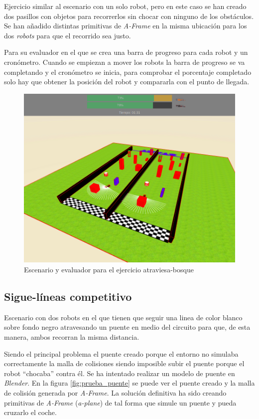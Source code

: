 Ejercicio similar al escenario con un solo robot, pero en este caso se han creado dos pasillos con objetos para recorrerlos sin chocar con ninguno de los obstáculos. Se han añadido distintas primitivas de \textit{A-Frame} en la misma ubicación para los dos \textit{robots} para que el recorrido sea justo.

Para su evaluador en el que se crea una barra de progreso para cada robot y un cronómetro. Cuando se empiezan a mover los robots la barra de progreso se va completando y el cronómetro se inicia, para comprobar el porcentaje completado solo hay que obtener la posición del robot y compararla con el punto de llegada.

\begin{figure}[H]
\centering           
\includegraphics[scale=0.3]{img/evaluador_forest.png}
\caption{Escenario y evaluador para el ejercicio atraviesa-bosque}
\label{fig:evaluador_bosque}
\end{figure}


\subsection{Sigue-líneas competitivo}

Escenario con dos robots en el que tienen que seguir una linea de color blanco sobre fondo negro atravesando un puente en medio del circuito para que, de esta manera, ambos recorran la misma distancia.

Siendo el principal problema el puente creado porque el entorno no simulaba correctamente la malla de colisiones siendo imposible subir el puente porque el robot ``chocaba'' contra él. Se ha intentado realizar un modelo de puente en \textit{Blender}. En la figura \ref{fig:prueba_puente} se puede ver el puente creado y la malla de colisión generada por \textit{A-Frame}. 
La solución definitiva ha sido creando primitivas de \textit{A-Frame} (\textit{a-plane}) de tal forma que simule un puente y pueda cruzarlo el coche. 

